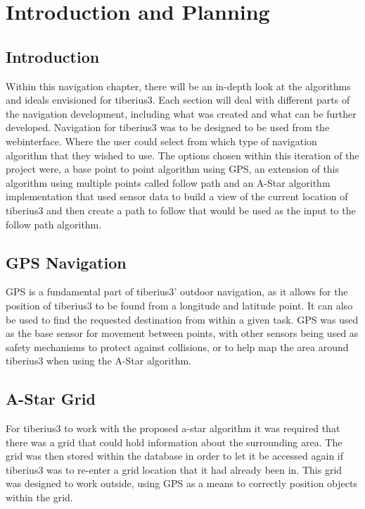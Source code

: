 \section{Introduction and Planning}

\subsection{Introduction}
Within this navigation chapter, there will be an in-depth look at the algorithms and ideals envisioned for \gls{tiberius3}. Each section will deal with different parts of the navigation development, including what was created and what can be further developed.
\newline
Navigation for \gls{tiberius3} was to be designed to be used from the \gls{webinterface}. Where the user could select from which type of navigation algorithm that they wished to use. The options chosen within this iteration of the project were, a base point to point algorithm using GPS, an extension of this algorithm using multiple points called follow path and an A-Star algorithm implementation that used sensor data to build a view of the current location of \gls{tiberius3} and then create a path to follow that would be used as the input to the follow path algorithm.

\subsection{GPS Navigation}
\gls{GPS} is a fundamental part of \gls{tiberius3}' outdoor navigation, as it allows for the position of \gls{tiberius3} to be found from a longitude and latitude point. It can also be used to find the requested destination from within a given task. \gls{GPS} was used as the base sensor for movement between points, with other sensors being used as safety mechanisms to protect against collisions, or to help map the area around \gls{tiberius3} when using the A-Star algorithm.

\subsection{A-Star Grid}
For \gls{tiberius3} to work with the proposed \gls{a-star} algorithm it was required that there was a grid that could hold information about the surrounding area. The grid was then stored within the database in order to let it be accessed again if \gls{tiberius3} was to re-enter a grid location that it had already been in. This grid was designed to work outside, using \gls{GPS} as a means to correctly position objects within the grid.

